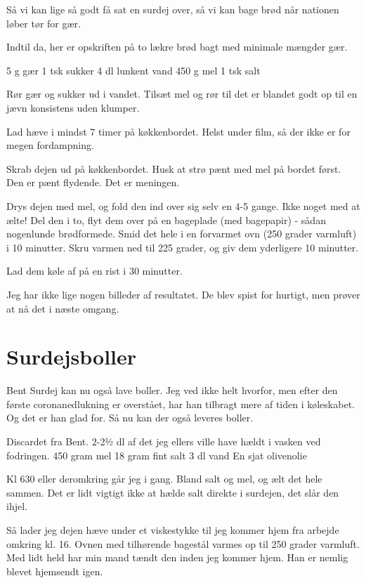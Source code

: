 \documentclass[
  letterpaper,
  DIV=11,
  numbers=noendperiod]{scrreprt}
\begin{document}
Så vi kan lige så godt få sat en surdej over, så vi kan bage brød når
nationen løber tør for gær.

Indtil da, her er opskriften på to lækre brød bagt med minimale mængder
gær.

5 g gær 1 tsk sukker 4 dl lunkent vand 450 g mel 1 tsk salt

Rør gær og sukker ud i vandet. Tilsæt mel og rør til det er blandet godt
op til en jævn konsistens uden klumper.

Lad hæve i mindst 7 timer på køkkenbordet. Helst under film, så der ikke
er for megen fordampning.

Skrab dejen ud på køkkenbordet. Husk at strø pænt med mel på bordet
først. Den er pænt flydende. Det er meningen.

Drys dejen med mel, og fold den ind over sig selv en 4-5 gange. Ikke
noget med at ælte! Del den i to, flyt dem over på en bageplade (med
bagepapir) - sådan nogenlunde brødformede. Smid det hele i en forvarmet
ovn (250 grader varmluft) i 10 minutter. Skru varmen ned til 225 grader,
og giv dem yderligere 10 minutter.

Lad dem køle af på en rist i 30 minutter.

Jeg har ikke lige nogen billeder af resultatet. De blev spist for
hurtigt, men prøver at nå det i næste omgang.

\hypertarget{surdejsboller}{%
\section{Surdejsboller}\label{surdejsboller}}

Bent Surdej kan nu også lave boller. Jeg ved ikke helt hvorfor, men
efter den første coronanedlukning er overstået, har han tilbragt mere af
tiden i køleskabet. Og det er han glad for. Så nu kan der også leveres
boller.

Discardet fra Bent. 2-2½ dl af det jeg ellers ville have hældt i vasken
ved fodringen. 450 gram mel 18 gram fint salt 3 dl vand En sjat
olivenolie

Kl 630 eller deromkring går jeg i gang. Bland salt og mel, og ælt det
hele sammen. Det er lidt vigtigt ikke at hælde salt direkte i surdejen,
det slår den ihjel.

Så lader jeg dejen hæve under et viskestykke til jeg kommer hjem fra
arbejde omkring kl. 16. Ovnen med tilhørende bagestål varmes op til 250
grader varmluft. Med lidt held har min mand tændt den inden jeg kommer
hjem. Han er nemlig blevet hjemsendt igen.
\end{document}
